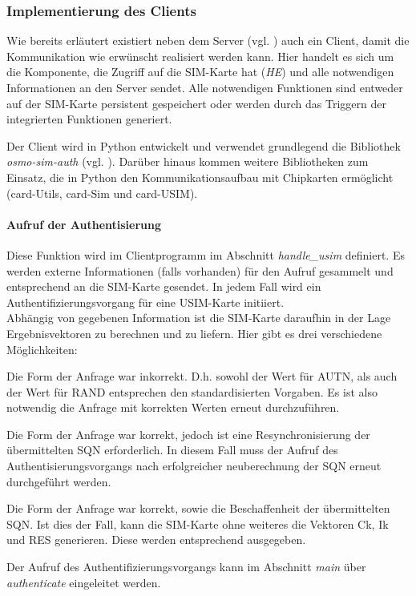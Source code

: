     \subsubsection{Implementierung des Clients}
    Wie bereits erläutert existiert neben dem Server (vgl. ) auch ein Client,
    damit die Kommunikation wie erwünscht realisiert werden kann. Hier handelt es sich um die Komponente,
    die Zugriff auf die SIM-Karte hat (\emph{HE}) und alle notwendigen Informationen an den Server sendet.
    Alle notwendigen Funktionen sind entweder auf der SIM-Karte persistent gespeichert oder werden durch
    das Triggern der integrierten Funktionen generiert.

    Der Client wird in Python entwickelt und verwendet grundlegend die Bibliothek \textit{osmo-sim-auth}
    (vgl. ). Darüber hinaus kommen weitere  Bibliotheken zum Einsatz, die in
    Python den Kommunikationsaufbau mit Chipkarten ermöglicht (card-Utils, card-Sim und card-USIM).
        \paragraph{Aufruf der Authentisierung} Diese Funktion wird im Clientprogramm im Abschnitt
        \textit{handle\_usim} definiert. Es werden externe Informationen (falls vorhanden) für den Aufruf
        gesammelt und entsprechend an die SIM-Karte gesendet. In jedem Fall wird ein Authentifizierungsvorgang
        für eine USIM-Karte initiiert. \\
        Abhängig von gegebenen Information ist die SIM-Karte daraufhin in der Lage Ergebnisvektoren
        zu berechnen und zu liefern. Hier gibt es drei verschiedene Möglichkeiten:
            \begin{addmargin}[1em]{2em}
            Die Form der Anfrage war inkorrekt. D.h. sowohl der Wert für AUTN, als auch der Wert für RAND entsprechen
            den standardisierten Vorgaben. Es ist also notwendig die Anfrage mit korrekten Werten erneut
            durchzuführen.

            Die Form der Anfrage war korrekt, jedoch ist eine Resynchronisierung der übermittelten SQN erforderlich.
            In diesem Fall muss der Aufruf des Authentisierungsvorgangs nach erfolgreicher neuberechnung der SQN
            erneut durchgeführt werden.

            Die Form der Anfrage war korrekt, sowie die Beschaffenheit der übermittelten SQN. Ist dies der Fall,
            kann die SIM-Karte ohne weiteres die Vektoren Ck, Ik und RES generieren. Diese werden entsprechend
            ausgegeben.
            \end{addmargin}
        Der Aufruf des Authentifizierungsvorgangs kann im Abschnitt \textit{main} über \textit{authenticate}
        eingeleitet werden.


